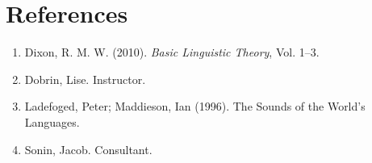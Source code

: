 \documentclass[pdftex,12pt,letterpaper]{article}
\begin{document}
 \pagebreak
 \section*{References}

 \begin{enumerate}

 \item Dixon, R. M. W. (2010). \emph{Basic Linguistic Theory}, Vol. 1--3.

 \item Dobrin, Lise. Instructor.

 \item Ladefoged, Peter; Maddieson, Ian (1996). The Sounds of the World's Languages.

 \item Sonin, Jacob. Consultant.
 


 \end{enumerate}




 
\end{document}
